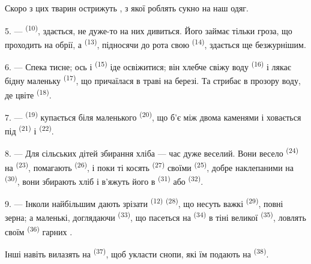 Скоро з цих тварин острижуть , з якої роблять сукно на наш одяг.

\VUsaut{5.0mm}
\VUsaut{3.4mm}

5. ---  \textsuperscript{(10)}, здається, не дуже-то на них
дивиться. Його займає тільки гроза, що проходить на обрії, а 
\textsuperscript{(13)}, підносячи до рота свою 
\textsuperscript{(14)}, здається ще безжурнішим.

6. --- Спека тисне; ось і  \textsuperscript{(15)} іде освіжитися;
він хлебче свіжу воду  \textsuperscript{(16)} і лякає бідну
маленьку  \textsuperscript{(17)}, що причаїлася в траві на березі. Та
стрибає в прозору воду, де цвіте  \textsuperscript{(18)}.

7. ---  \textsuperscript{(19)} купається біля маленького
 \textsuperscript{(20)}, що б'є між двома каменями і ховається під
 \textsuperscript{(21)} і 
\textsuperscript{(22)}.

\VUsaut{5.0mm}
\VUsaut{3.4mm}

8. --- Для сільських дітей збирання хліба --- час дуже веселий. Вони весело
 \textsuperscript{(24)} на 
\textsuperscript{(23)}, помагають  \textsuperscript{(26)}, і поки
ті косять  \textsuperscript{(27)} своїми 
\textsuperscript{(25)}, добре наклепаними на 
\textsuperscript{(30)}, вони збирають хліб і в'яжуть його в 
\textsuperscript{(31)} або  \textsuperscript{(32)}.

9. --- Інколи найбільшим дають зрізати  \textsuperscript{(12)}
 \textsuperscript{(28)}, що несуть важкі 
\textsuperscript{(29)}, повні зерна; а маленькі, доглядаючи 
\textsuperscript{(33)}, що пасеться на  \textsuperscript{(34)} в тіні
великої  \textsuperscript{(35)}, ловлять своїм 
\textsuperscript{(36)} гарних .

Інші навіть вилазять на  \textsuperscript{(37)}, щоб укласти снопи,
які їм подають на  \textsuperscript{(38)}.

